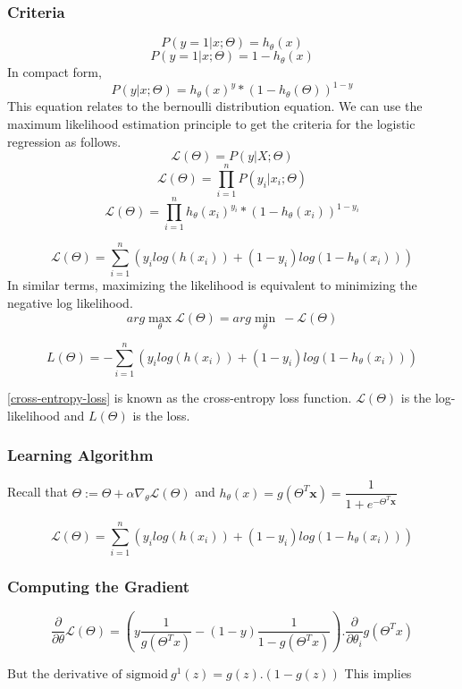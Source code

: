 \documentclass[12pt,a4paper,titlepage,landscape]{book}
\begin{document}
	\subsubsection{Criteria}
	$$P(y = 1 | x;\Theta) = h_\theta(x)$$
	$$P(y = 1 | x;\Theta) = 1 - h_\theta(x)$$
	In compact form,
	$$P(y|x;\Theta) = h_\theta(x)^y * (1-h_\theta(\Theta))^{1-y}$$ 
	This equation relates to the bernoulli distribution equation. We can use the maximum likelihood estimation principle to get the criteria for the logistic regression as follows.
	$$\mathcal{L}(\Theta) = P(y|X;\Theta)$$
	$$\mathcal{L}(\Theta) = \prod_{i=1}^{n}P(y_i|x_i;\Theta)$$
	$$\mathcal{L}(\Theta) = \prod_{i=1}^{n}h_\theta(x_i)^{y_i} * (1-h_\theta(x_i))^{1-y_i}$$
	
	$$
		\mathcal{L}(\Theta) = \sum_{i=1}^{n}\left(y_ilog(h(x_i)) + (1-y_i)log(1-h_\theta(x_i))\right)
	$$
	In similar terms, maximizing the likelihood is equivalent to minimizing the negative log likelihood.
	$$arg\max\limits_{\theta}\mathcal{L}(\Theta) = arg\min\limits_{\theta}~-\mathcal{L}(\Theta)$$
	
	\begin{equation}\label{cross-entropy-loss}
	L(\Theta) = -\sum_{i=1}^{n}\left(y_ilog(h(x_i)) + (1-y_i)log(1-h_\theta(x_i))\right)
	\end{equation}
	
	\eqref{cross-entropy-loss} is known as the cross-entropy loss function. $\mathcal{L}(\Theta)$ is the log-likelihood and $L(\Theta)$ is the loss.
	
	\subsubsection{Learning Algorithm}
	Recall that $\Theta := \Theta + \alpha\nabla_\theta\mathcal{L}(\Theta)$ and $h_\theta(x) = g(\Theta^T\boldsymbol{x}) = \dfrac{1}{1+e^{-\Theta^T\boldsymbol{x}}}$
	
	$$
	\mathcal{L}(\Theta) = \sum_{i=1}^{n}\left(y_ilog(h(x_i)) + (1-y_i)log(1-h_\theta(x_i))\right)
	$$
	
	\subsubsection{Computing the Gradient}
	$$\dfrac{\partial}{\partial\theta}\mathcal{L}(\Theta) = \left(y\dfrac{1}{g(\Theta^Tx)} - (1-y)\dfrac{1}{1-g(\Theta^Tx)}\right).\dfrac{\partial}{\partial\theta_i}g(\Theta^Tx)$$
	
	$\text{But the derivative of sigmoid}~ g^1(z) = g(z).(1-g(z)) $ This implies
	
\end{document}
